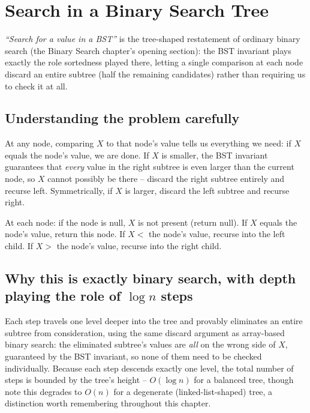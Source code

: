 \section{Search in a Binary Search Tree}
\label{sec:bst-search}


\begin{patternbox}
\emph{``Search for a value in a BST''} is the tree-shaped restatement of
ordinary binary search (the Binary Search chapter's opening section): the BST invariant
plays exactly the role sortedness played there, letting a single
comparison at each node discard an entire subtree (half the remaining
candidates) rather than requiring us to check it at all.
\end{patternbox}

\subsection*{Understanding the problem carefully}

At any node, comparing $X$ to that node's value tells us everything we
need: if $X$ equals the node's value, we are done. If $X$ is smaller, the
BST invariant guarantees that \emph{every} value in the right subtree is
even larger than the current node, so $X$ cannot possibly be there --
discard the right subtree entirely and recurse left. Symmetrically, if
$X$ is larger, discard the left subtree and recurse right.

\begin{ideabox}
At each node: if the node is null, $X$ is not present (return null). If
$X$ equals the node's value, return this node. If $X<$ the node's value,
recurse into the left child. If $X>$ the node's value, recurse into the
right child.
\end{ideabox}

\subsection*{Why this is exactly binary search, with depth playing the role of $\log n$ steps}

Each step travels one level deeper into the tree and provably eliminates
an entire subtree from consideration, using the same discard argument as
array-based binary search: the eliminated subtree's values are
\emph{all} on the wrong side of $X$, guaranteed by the BST invariant, so
none of them need to be checked individually. Because each step descends
exactly one level, the total number of steps is bounded by the tree's
height -- $O(\log n)$ for a balanced tree, though note this degrades to
$O(n)$ for a degenerate (linked-list-shaped) tree, a distinction worth
remembering throughout this chapter.

